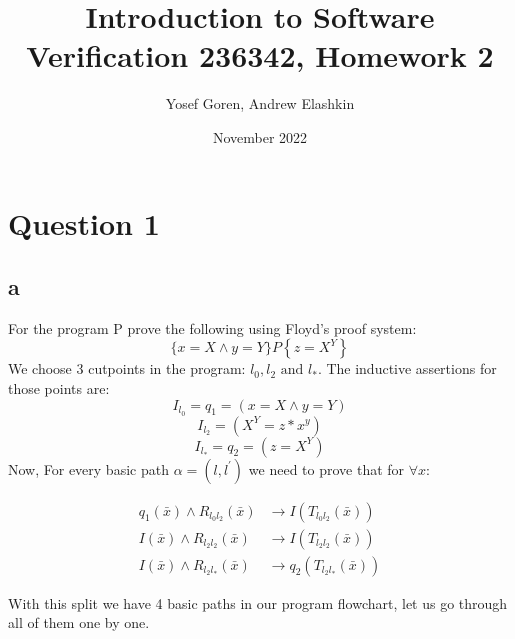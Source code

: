 \documentclass{article}
\begin{document}
\author{Yosef Goren, Andrew Elashkin}
\date{November 2022}
\title{Introduction to Software Verification 236342, Homework 2}
\maketitle
\section*{Question 1}
\subsection*{a}
For the program P prove the following using Floyd's proof system:
$$
\{x=X \wedge y=Y\} P\left\{z=X^Y\right\}
$$
We choose 3 cutpoints in the program: $l_0, l_2 \text{ and } l_*$. The inductive assertions for those points are:
$$ I_{l_0} = q_1 = (x=X \wedge y=Y)$$
$$ I_{l_2}=(X^Y= z*x^y) $$
$$ I_{l_*} = q_2 =(z=X^Y) $$
Now, For every basic path $\alpha=\left(l, l^{\prime}\right)$ we need to prove that for $\forall x$: 

\begin{align}
q_1(\bar{x}) \wedge R_{l_0 l_2}(\bar{x}) &\rightarrow I\left(T_{l_0 l_2}(\bar{x})\right) \\
I(\bar{x}) \wedge R_{l_2 l_2}(\bar{x}) &\rightarrow I\left(T_{l_2 l_2}(\bar{x})\right) \\
I(\bar{x}) \wedge R_{l_2 l_*}(\bar{x}) &\rightarrow q_2\left(T_{l_2 l_*}(\bar{x})\right)
\end{align}

With this split we have 4 basic paths in our program flowchart, let us go through all of them one by one.
\end{document}
